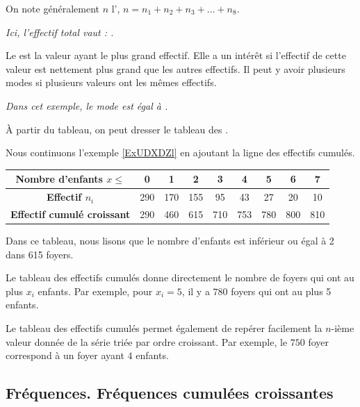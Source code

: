 On note généralement $n$ l', $n=n_1+n_2+n_3+{\ldots}+n_8$. 

\textit{Ici, l'effectif total vaut :  \comp. }

Le  est la valeur ayant le plus grand effectif. Elle a un intérêt si l'effectif de cette valeur est nettement plus grand que les autres effectifs. Il peut y avoir plusieurs modes si plusieurs valeurs ont les mêmes effectifs.

\textit{Dans cet exemple, le mode est égal à \comp.}

À partir du tableau, on peut dresser le tableau des .

\begin{example} \label{ExZdeBXW}
    Nous continuons l'exemple \ref{ExUDXDZl} en ajoutant la ligne des effectifs cumulés.
\begin{center}
\begin{tabular}[h]{|c|c|c|c|c|c|c|c|c|}
    \hline
  \textbf{Nombre d'enfants $x\leq$} & 0 & 1 & 2 & 3 & 4 & 5 & 6 & 7 \\
  \hline
  \textbf{Effectif $n_i$} & 290 & 170 & 155 & 95 & 43 & 27 & 20 & 10 \\
  \hline
  \textbf{Effectif cumulé croissant} & 290 & 460 & 615 & 710 & 753 & 780 & 800 & 810 \\ 
  \hline
\end{tabular}
    
\end{center}

Dans ce tableau, nous lisons  que le nombre d'enfants est inférieur ou égal à 2 dans 615 foyers.
    
\end{example}



\begin{remark}
Le tableau des effectifs cumulés donne directement le nombre de foyers qui ont au plus $x_i$ enfants.  Par exemple, pour $x_i=5$, il y a \( 780\) foyers qui ont au plus 5 enfants.
\end{remark}


\begin{remark}
Le tableau des effectifs cumulés permet également de repérer facilement la $n$-ième valeur donnée de la série triée par ordre croissant.  Par exemple, le $750$\ieme{} foyer correspond à un foyer ayant \( 4\) enfants. 
\end{remark}


\subsection{Fréquences. Fréquences cumulées croissantes}


